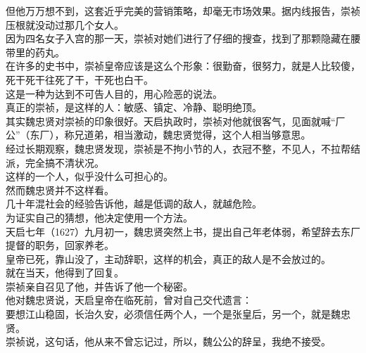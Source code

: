 \begin{multicols}{\theparacolNo}
但他万万想不到，这套近乎完美的营销策略，却毫无市场效果。据内线报告，崇祯压根就没动过那几个女人。\\

因为四名女子入宫的那一天，崇祯对她们进行了仔细的搜查，找到了那颗隐藏在腰带里的药丸。\\

在许多的史书中，崇祯皇帝应该是这么个形象：很勤奋，很努力，就是人比较傻，死干死干往死了干，干死也白干。\\

这是一种为达到不可告人目的，用心险恶的说法。\\

真正的崇祯，是这样的人：敏感、镇定、冷静、聪明绝顶。\\

其实魏忠贤对崇祯的印象很好。天启执政时，崇祯对他就很客气，见面就喊“厂公”（东厂），称兄道弟，相当激动，魏忠贤觉得，这个人相当够意思。\\

经过长期观察，魏忠贤发现，崇祯是不拘小节的人，衣冠不整，不见人，不拉帮结派，完全搞不清状况。\\

这样的一个人，似乎没什么可担心的。\\

然而魏忠贤并不这样看。\\

几十年混社会的经验告诉他，越是低调的敌人，就越危险。\\

为证实自己的猜想，他决定使用一个方法。\\

天启七年（1627）九月初一，魏忠贤突然上书，提出自己年老体弱，希望辞去东厂提督的职务，回家养老。\\

皇帝已死，靠山没了，主动辞职，这样的机会，真正的敌人是不会放过的。\\

就在当天，他得到了回复。\\

崇祯亲自召见了他，并告诉了他一个秘密。\\

他对魏忠贤说，天启皇帝在临死前，曾对自己交代遗言：\\

要想江山稳固，长治久安，必须信任两个人，一个是张皇后，另一个，就是魏忠贤。\\

崇祯说，这句话，他从来不曾忘记过，所以，魏公公的辞呈，我绝不接受。\\


\end{multicols}
